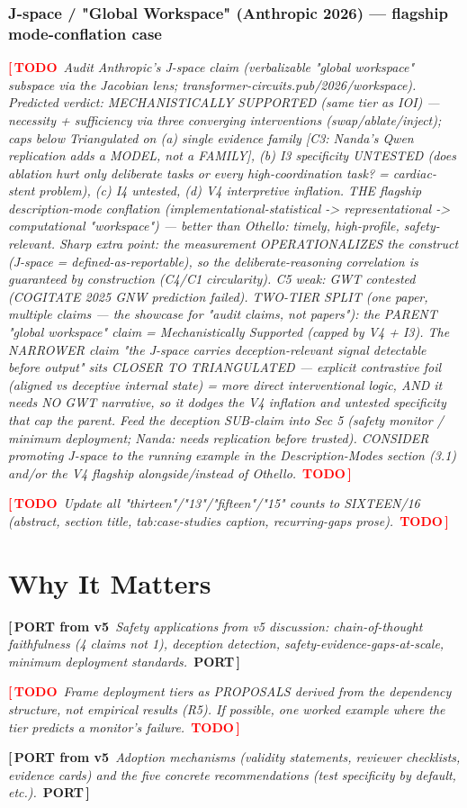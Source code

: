 \documentclass{article}
\newcommand{\TODO}[1]{\par\smallskip\noindent\textcolor{red}{\textbf{[\,TODO}}\ \textit{\textcolor{black!65}{#1}}\ \textcolor{red}{\textbf{TODO\,]}}\par\smallskip}
\newcommand{\PORT}[1]{\par\smallskip\noindent\textcolor{blue!65!black}{\textbf{[\,PORT from v5}}\ \textit{\textcolor{black!65}{#1}}\ \textcolor{blue!65!black}{\textbf{PORT\,]}}\par\smallskip}
\begin{document}
\subsubsection{J-space / "Global Workspace" (Anthropic 2026) --- flagship mode-conflation case}
\TODO{Audit Anthropic's J-space claim (verbalizable "global workspace" subspace via the Jacobian
lens; transformer-circuits.pub/2026/workspace). Predicted verdict: MECHANISTICALLY SUPPORTED (same
tier as IOI) --- necessity + sufficiency via three converging interventions (swap/ablate/inject);
caps below Triangulated on (a) single evidence family [C3: Nanda's Qwen replication adds a MODEL,
not a FAMILY], (b) I3 specificity UNTESTED (does ablation hurt only deliberate tasks or every
high-coordination task? = cardiac-stent problem), (c) I4 untested, (d) V4 interpretive inflation.
THE flagship description-mode conflation (implementational-statistical -> representational ->
computational "workspace") --- better than Othello: timely, high-profile, safety-relevant. Sharp
extra point: the measurement OPERATIONALIZES the construct (J-space = defined-as-reportable), so the
deliberate-reasoning correlation is guaranteed by construction (C4/C1 circularity). C5 weak: GWT
contested (COGITATE 2025 GNW prediction failed).
TWO-TIER SPLIT (one paper, multiple claims --- the showcase for "audit claims, not papers"): the
PARENT "global workspace" claim = Mechanistically Supported (capped by V4 + I3). The NARROWER claim
"the J-space carries deception-relevant signal detectable before output" sits CLOSER TO TRIANGULATED
--- explicit contrastive foil (aligned vs deceptive internal state) = more direct interventional
logic, AND it needs NO GWT narrative, so it dodges the V4 inflation and untested specificity that cap
the parent. Feed the deception SUB-claim into Sec 5 (safety monitor / minimum deployment; Nanda: needs
replication before trusted). CONSIDER promoting J-space to the running example in the Description-Modes
section (3.1) and/or the V4 flagship alongside/instead of Othello.}

\TODO{Update all "thirteen"/"13"/"fifteen"/"15" counts to SIXTEEN/16 (abstract, section title,
tab:case-studies caption, recurring-gaps prose).}

\section{Why It Matters}
\label{sec:implications}
\PORT{Safety applications from v5 discussion: chain-of-thought faithfulness (4 claims not 1),
deception detection, safety-evidence-gaps-at-scale, minimum deployment standards.}
\TODO{Frame deployment tiers as PROPOSALS derived from the dependency structure, not empirical
results (R5). If possible, one worked example where the tier predicts a monitor's failure.}
\PORT{Adoption mechanisms (validity statements, reviewer checklists, evidence cards) and the
five concrete recommendations (test specificity by default, etc.).}
\end{document}
